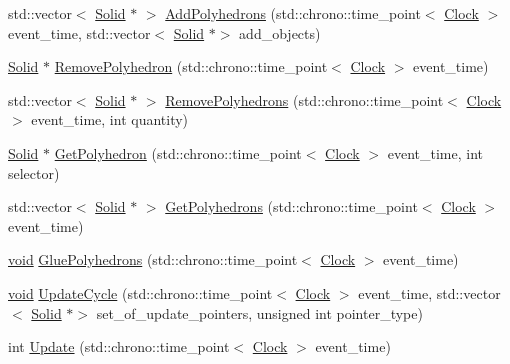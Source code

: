 \begin{DoxyCompactItemize}
\item 
std\+::vector$<$ \mbox{\hyperlink{class_solid}{Solid}} $\ast$ $>$ \mbox{\hyperlink{class_solid_a649ba1103a9889bc9e45256633dc72c3}{Add\+Polyhedrons}} (std\+::chrono\+::time\+\_\+point$<$ \mbox{\hyperlink{universe_8h_a0ef8d951d1ca5ab3cfaf7ab4c7a6fd80}{Clock}} $>$ event\+\_\+time, std\+::vector$<$ \mbox{\hyperlink{class_solid}{Solid}} $\ast$$>$ add\+\_\+objects)
\item 
\mbox{\hyperlink{class_solid}{Solid}} $\ast$ \mbox{\hyperlink{class_solid_a1233a3fe43abca7d2a0f83d724fd6640}{Remove\+Polyhedron}} (std\+::chrono\+::time\+\_\+point$<$ \mbox{\hyperlink{universe_8h_a0ef8d951d1ca5ab3cfaf7ab4c7a6fd80}{Clock}} $>$ event\+\_\+time)
\item 
std\+::vector$<$ \mbox{\hyperlink{class_solid}{Solid}} $\ast$ $>$ \mbox{\hyperlink{class_solid_a0fc53641571eb796c9d6bc33ae7a7138}{Remove\+Polyhedrons}} (std\+::chrono\+::time\+\_\+point$<$ \mbox{\hyperlink{universe_8h_a0ef8d951d1ca5ab3cfaf7ab4c7a6fd80}{Clock}} $>$ event\+\_\+time, int quantity)
\item 
\mbox{\hyperlink{class_solid}{Solid}} $\ast$ \mbox{\hyperlink{class_solid_a256ecadf461f7232eb05c28b6b4b438a}{Get\+Polyhedron}} (std\+::chrono\+::time\+\_\+point$<$ \mbox{\hyperlink{universe_8h_a0ef8d951d1ca5ab3cfaf7ab4c7a6fd80}{Clock}} $>$ event\+\_\+time, int selector)
\item 
std\+::vector$<$ \mbox{\hyperlink{class_solid}{Solid}} $\ast$ $>$ \mbox{\hyperlink{class_solid_a7006714c19bf8a7b020f42f394e4edc0}{Get\+Polyhedrons}} (std\+::chrono\+::time\+\_\+point$<$ \mbox{\hyperlink{universe_8h_a0ef8d951d1ca5ab3cfaf7ab4c7a6fd80}{Clock}} $>$ event\+\_\+time)
\item 
\mbox{\hyperlink{glad_8h_a950fc91edb4504f62f1c577bf4727c29}{void}} \mbox{\hyperlink{class_solid_a94bb5df6d873c14a94355fc95557efd6}{Glue\+Polyhedrons}} (std\+::chrono\+::time\+\_\+point$<$ \mbox{\hyperlink{universe_8h_a0ef8d951d1ca5ab3cfaf7ab4c7a6fd80}{Clock}} $>$ event\+\_\+time)
\item 
\mbox{\hyperlink{glad_8h_a950fc91edb4504f62f1c577bf4727c29}{void}} \mbox{\hyperlink{class_solid_a17239817eba0e5870454311857dca736}{Update\+Cycle}} (std\+::chrono\+::time\+\_\+point$<$ \mbox{\hyperlink{universe_8h_a0ef8d951d1ca5ab3cfaf7ab4c7a6fd80}{Clock}} $>$ event\+\_\+time, std\+::vector$<$ \mbox{\hyperlink{class_solid}{Solid}} $\ast$$>$ set\+\_\+of\+\_\+update\+\_\+pointers, unsigned int pointer\+\_\+type)
\item 
int \mbox{\hyperlink{class_solid_a248a5eab9fa0c584af7cdec2f86dc3a3}{Update}} (std\+::chrono\+::time\+\_\+point$<$ \mbox{\hyperlink{universe_8h_a0ef8d951d1ca5ab3cfaf7ab4c7a6fd80}{Clock}} $>$ event\+\_\+time)

\end{DoxyCompactItemize}
